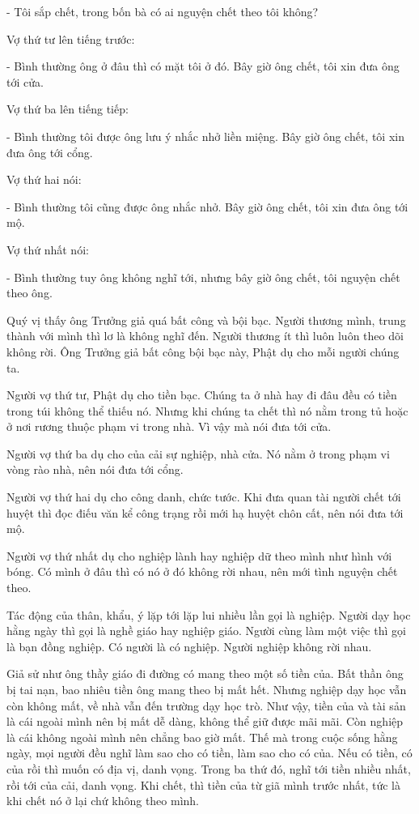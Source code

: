 \documentclass[
  12pt,
  oneside]{book}
\begin{document}
- Tôi sắp chết, trong bốn bà có ai nguyện chết theo tôi không?

Vợ thứ tư lên tiếng trước:

- Bình thường ông ở đâu thì có mặt tôi ở đó. Bây giờ ông chết, tôi xin đưa ông tới cửa.

Vợ thứ ba lên tiếng tiếp:

- Bình thường tôi được ông lưu ý nhắc nhở liền miệng. Bây giờ ông chết, tôi xin đưa ông tới cổng.

Vợ thứ hai nói:

- Bình thường tôi cũng được ông nhắc nhở. Bây giờ ông chết, tôi xin đưa ông tới mộ.

Vợ thứ nhất nói:

- Bình thường tuy ông không nghĩ tới, nhưng bây giờ ông chết, tôi nguyện chết theo ông.

Quý vị thấy ông Trưởng giả quá bất công và bội bạc. Người thương mình, trung thành với mình thì lơ là không nghĩ đến. Người thương ít thì luôn luôn theo dõi không rời. Ông Trưởng giả bất công bội bạc này, Phật dụ cho mỗi người chúng ta.

Người vợ thứ tư, Phật dụ cho tiền bạc. Chúng ta ở nhà hay đi đâu đều có tiền trong túi không thể thiếu nó. Nhưng khi chúng ta chết thì nó nằm trong tủ hoặc ở nơi rương thuộc phạm vi trong nhà. Vì vậy mà nói đưa tới cửa.

Người vợ thứ ba dụ cho của cải sự nghiệp, nhà cửa. Nó nằm ở trong phạm vi vòng rào nhà, nên nói đưa tới cổng.

Người vợ thứ hai dụ cho công danh, chức tước. Khi đưa quan tài người chết tới huyệt thì đọc điếu văn kể công trạng rồi mới hạ huyệt chôn cất, nên nói đưa tới mộ.

Người vợ thứ nhất dụ cho nghiệp lành hay nghiệp dữ theo mình như hình với bóng. Có mình ở đâu thì có nó ở đó không rời nhau, nên mới tình nguyện chết theo.

Tác động của thân, khẩu, ý lặp tới lặp lui nhiều lần gọi là nghiệp. Người dạy học hằng ngày thì gọi là nghề giáo hay nghiệp giáo. Người cùng làm một việc thì gọi là bạn đồng nghiệp. Có người là có nghiệp. Người nghiệp không rời nhau.

Giả sử như ông thầy giáo đi đường có mang theo một số tiền của. Bất thần ông bị tai nạn, bao nhiêu tiền ông mang theo bị mất hết. Nhưng nghiệp dạy học vẫn còn không mất, về nhà vẫn đến trường dạy học trò. Như vậy, tiền của và tài sản là cái ngoài mình nên bị mất dễ dàng, không thể giữ được mãi mãi. Còn nghiệp là cái không ngoài mình nên chẳng bao giờ mất. Thế mà trong cuộc sống hằng ngày, mọi người đều nghĩ làm sao cho có tiền, làm sao cho có của. Nếu có tiền, có của rồi thì muốn có địa vị, danh vọng. Trong ba thứ đó, nghĩ tới tiền nhiều nhất, rồi tới của cải, danh vọng. Khi chết, thì tiền của từ giã mình trước nhất, tức là khi chết nó ở lại chứ không theo mình.
\end{document}
